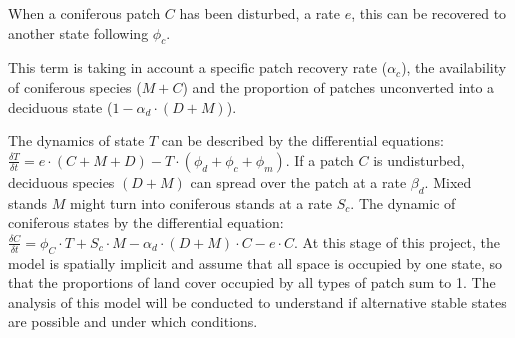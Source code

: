 
When a coniferous patch $C$ has been disturbed, a rate $e$, this can be
recovered to another state following $\phi_c$. 


This term is taking in account a specific patch recovery rate ($\alpha_{c}$),
the availability of coniferous species ($M+C$) and the proportion of patches
unconverted into a deciduous state ($1- \alpha_d \cdot (D +M)$).


The dynamics of state $T$ can be described by the differential equations:
$\frac{\delta T}{\delta t} = e \cdot (C+M+D) - T \cdot (\phi_d + \phi_c +
\phi_m)$. If a patch $C$ is undisturbed, deciduous species $(D+M)$ can spread
over the patch at a rate $\beta_d$. Mixed stands $M$ might turn into
coniferous stands at a rate $S_c$.  The dynamic of coniferous states by the
differential equation: $\frac{\delta C}{\delta t} = \phi_C \cdot T + S_c \cdot
M - \alpha_d \cdot (D+M)\cdot C - e \cdot C$. At this stage of this project,
the model is spatially implicit and assume that all space is occupied by one
state, so that the proportions of land cover occupied by all types of patch
sum to 1. The analysis of this model will be conducted to understand if
alternative stable states are possible  and under which conditions.\\

